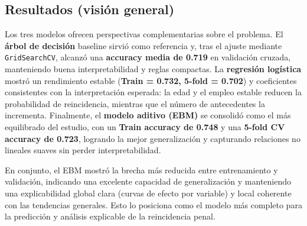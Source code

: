 \subsection{Resultados (visión general)}

Los tres modelos ofrecen perspectivas complementarias sobre el problema.  
El \textbf{árbol de decisión} baseline sirvió como referencia y, tras el ajuste mediante \texttt{GridSearchCV}, alcanzó una \textbf{accuracy media de 0.719} en validación cruzada, manteniendo buena interpretabilidad y reglas compactas.  
La \textbf{regresión logística} mostró un rendimiento estable (\textbf{Train = 0.732, 5-fold = 0.702}) y coeficientes consistentes con la interpretación esperada: la edad y el empleo estable reducen la probabilidad de reincidencia, mientras que el número de antecedentes la incrementa.  
Finalmente, el \textbf{modelo aditivo (EBM)} se consolidó como el más equilibrado del estudio, con un \textbf{Train accuracy de 0.748} y una \textbf{5-fold CV accuracy de 0.723}, logrando la mejor generalización y capturando relaciones no lineales suaves sin perder interpretabilidad.

En conjunto, el EBM mostró la brecha más reducida entre entrenamiento y validación, indicando una excelente capacidad de generalización y manteniendo una explicabilidad global clara (curvas de efecto por variable) y local coherente con las tendencias generales. Esto lo posiciona como el modelo más completo para la predicción y análisis explicable de la reincidencia penal.
